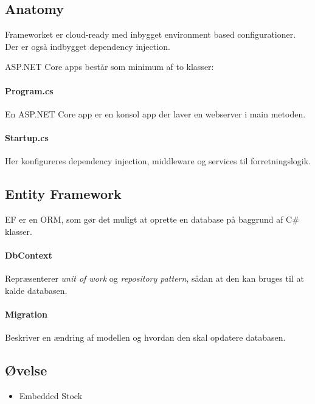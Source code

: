 \subsection{Anatomy}
Frameworket er cloud-ready med inbygget environment based configurationer. Der er også indbygget dependency injection.

ASP.NET Core apps består som minimum af to klasser:

\paragraph{Program.cs}
En ASP.NET Core app er en konsol app der laver en webserver i main metoden.

\paragraph{Startup.cs}
Her konfigureres dependency injection, middleware og services til forretningslogik.

\subsection{Entity Framework}
EF er en ORM, som gør det muligt at oprette en database på baggrund af C\# klasser.

\paragraph{DbContext}
Repræsenterer \textit{unit of work} og \textit{repository pattern}, sådan at den kan bruges til at kalde databasen.

\paragraph{Migration} Beskriver en ændring af modellen og hvordan den skal opdatere databasen.

\subsection{Øvelse}

\begin{itemize}
	\item Embedded Stock
\end{itemize}